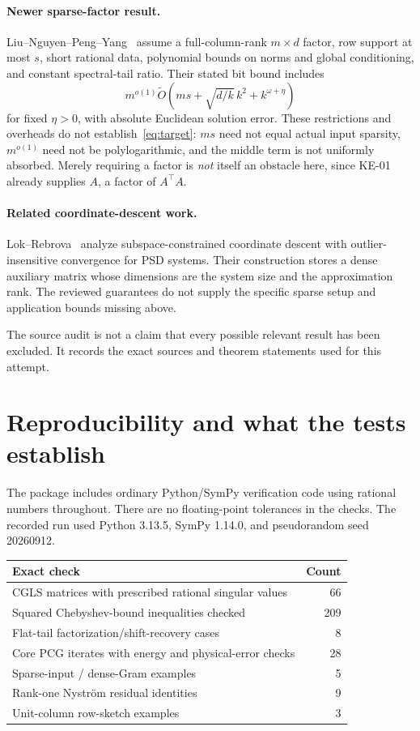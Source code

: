 \documentclass[11pt,a4paper]{article}
\newcommand{\softO}{\widetilde O}
\theoremstyle{definition}
\theoremstyle{remark}
\begin{document}
\paragraph{Newer sparse-factor result.}
Liu--Nguyen--Peng--Yang~\cite[Theorem 1.1]{lnpy} assume a full-column-rank $m\times d$ factor, row support at most $s$, short rational data, polynomial bounds on norms and global conditioning, and constant spectral-tail ratio. Their stated bit bound includes
\[
 m^{o(1)}\softO\left(ms+\sqrt{d/k}\,k^2+k^{\omega+\eta}\right)
\]
for fixed $\eta>0$, with absolute Euclidean solution error. These restrictions and overheads do not establish~\eqref{eq:target}: $ms$ need not equal actual input sparsity, $m^{o(1)}$ need not be polylogarithmic, and the middle term is not uniformly absorbed. Merely requiring a factor is \emph{not} itself an obstacle here, since KE-01 already supplies $A$, a factor of $A^\top A$.

\paragraph{Related coordinate-descent work.}
Lok--Rebrova~\cite[Theorem 1.7 and Section 1.2]{lr} analyze subspace-constrained coordinate descent with outlier-insensitive convergence for PSD systems. Their construction stores a dense auxiliary matrix whose dimensions are the system size and the approximation rank. The reviewed guarantees do not supply the specific sparse setup and application bounds missing above.

The source audit is not a claim that every possible relevant result has been excluded. It records the exact sources and theorem statements used for this attempt.

\section{Reproducibility and what the tests establish}
\label{sec:tests}
The package includes ordinary Python/SymPy verification code using rational numbers throughout. There are no floating-point tolerances in the checks. The recorded run used Python 3.13.5, SymPy 1.14.0, and pseudorandom seed 20260912.

\begin{center}
\begin{tabular}{p{}r}
\toprule
Exact check & Count\\
\midrule
CGLS matrices with prescribed rational singular values & 66\\
Squared Chebyshev-bound inequalities checked & 209\\
Flat-tail factorization/shift-recovery cases & 8\\
Core PCG iterates with energy and physical-error checks & 28\\
Sparse-input / dense-Gram examples & 5\\
Rank-one Nystr\"om residual identities & 9\\
Unit-column row-sketch examples & 3\\
\bottomrule
\end{tabular}
\end{center}
\end{document}
